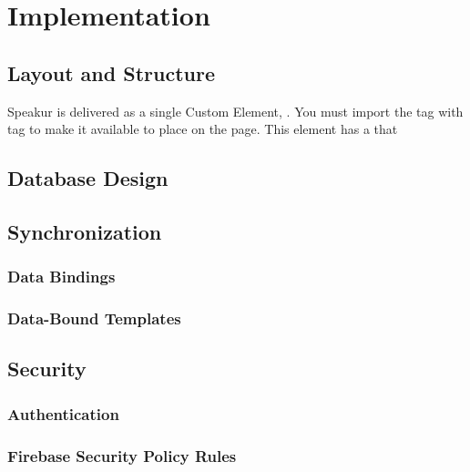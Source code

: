 \chapter{Implementation}
%


\section{Layout and Structure}
\label{sec:layout}

Speakur is delivered as a single Custom Element, .
You must import the tag with  tag to make it available to place on the page. 
This element has a  that 

\section{Database Design}
\label{sec:database}

\section{Synchronization}
\label{sec:sync}

\subsection{Data Bindings}
\label{sec:databindings}

\subsection{Data-Bound Templates}

\section{Security}
\label{sec:security}

\subsection{Authentication}

\subsection{Firebase Security Policy Rules}
\label{sec:security}

